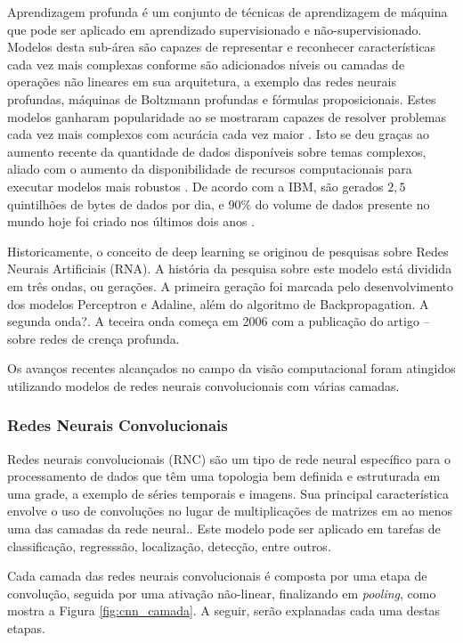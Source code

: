 
Aprendizagem profunda é um conjunto de técnicas de aprendizagem de máquina que pode ser aplicado em aprendizado supervisionado e não-supervisionado. Modelos desta sub-área são capazes de representar e reconhecer características cada vez mais complexas conforme são adicionados níveis ou camadas de operações não lineares em sua arquitetura, a exemplo das redes neurais profundas, máquinas de Boltzmann profundas e fórmulas proposicionais. Estes modelos ganharam popularidade ao se mostraram capazes de resolver problemas cada vez mais complexos com acurácia cada vez maior \cite{bengio2009learning}. Isto se deu graças ao aumento recente da quantidade de dados disponíveis sobre temas complexos, aliado com o aumento da disponibilidade de recursos computacionais para executar modelos mais robustos \cite{goodfellow2016deep}. De acordo com a IBM, são gerados $2,5$ quintilhões de bytes de dados por dia, e $90\%$ do volume de dados presente no mundo hoje foi criado nos últimos dois anos \cite{ibm2017bigdata}.

Historicamente, o conceito de deep learning se originou de pesquisas sobre Redes Neurais Artificiais (RNA). A história da pesquisa sobre este modelo está dividida em três ondas, ou gerações. A primeira geração foi marcada pelo desenvolvimento dos modelos Perceptron e Adaline, além do algoritmo de Backpropagation. A segunda onda?. A teceira onda começa em 2006 com a publicação do artigo -- sobre redes de crença profunda.

Os avanços recentes alcançados no campo da visão computacional foram atingidos utilizando modelos de redes neurais convolucionais com várias camadas.


\subsubsection{Redes Neurais Convolucionais}
Redes neurais convolucionais (RNC) são um tipo de rede neural específico para o processamento de dados que têm uma topologia bem definida e estruturada em uma grade, a exemplo de séries temporais e imagens. Sua principal característica envolve o uso de convoluções no lugar de multiplicações de matrizes em ao menos uma das camadas da rede neural.\cite{goodfellow2016deep}. Este modelo pode ser aplicado em tarefas de classificação, regresssão, localização, detecção, entre outros.

Cada camada das redes neurais convolucionais é composta por uma etapa de convolução, seguida por uma ativação não-linear, finalizando em \emph{pooling}, como mostra a Figura \ref{fig:cnn_camada}. A seguir, serão explanadas cada uma destas etapas.


